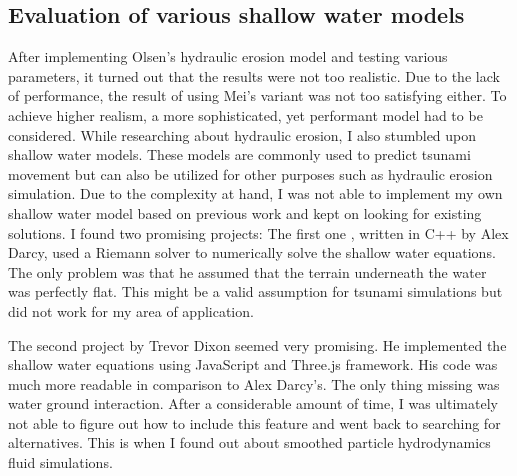 \documentclass[11pt,a4paper,twoside,openright]{report}
\begin{document}
\subsection{Evaluation of various shallow water models}
After implementing Olsen's hydraulic erosion model and testing various parameters, it turned out that the results were not too realistic. Due to the lack of performance, the result of using Mei's variant was not too satisfying either. To achieve higher realism, a more sophisticated, yet performant model had to be considered. While researching about hydraulic erosion, I also stumbled upon shallow water models. These models are commonly used to predict tsunami movement but can also be utilized for other purposes such as hydraulic erosion simulation. Due to the complexity at hand, I was not able to implement my own shallow water model based on previous work and kept on looking for existing solutions. I found two promising projects: The first one \cite{Darcy}, written in C++ by Alex Darcy, used a Riemann solver to numerically solve the shallow water equations. The only problem was that he assumed that the terrain underneath the water was perfectly flat. This might be a valid assumption for tsunami simulations but did not work for my area of application.

The second project \cite{Dixon} by Trevor Dixon seemed very promising. He implemented the shallow water equations using JavaScript and Three.js framework. His code was much more readable in comparison to Alex Darcy's. The only thing missing was water ground interaction. After a considerable amount of time, I was ultimately not able to figure out how to include this feature and went back to searching for alternatives. This is when I found out about smoothed particle hydrodynamics fluid simulations.
\end{document}
